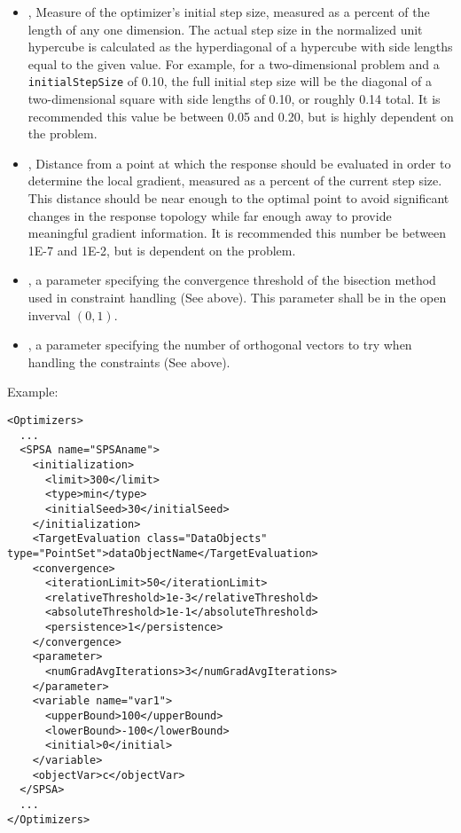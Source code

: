 \begin{itemize}
\begin{itemize}
  \item {},  Measure of the optimizer's initial step
    size, measured as a percent of the length of any one dimension. The actual step size in the normalized
    unit hypercube is calculated as the hyperdiagonal of a hypercube with side lengths equal to the given
    value. For example, for a two-dimensional problem and a \texttt{initialStepSize} of 0.10, the full initial
    step size will be the diagonal of a two-dimensional square with side lengths of 0.10, or roughly 0.14
    total. It is recommended this value be between 0.05 and 0.20, but is highly dependent on the problem.
  \item {},  Distance from a point at which the
    response should be evaluated in order to determine the local gradient, measured as a percent of the
    current step size. This distance should be near enough to the optimal point to avoid significant changes
    in the response topology while far enough away to provide meaningful gradient information. It is
    recommended this number be between 1E-7 and 1E-2, but is dependent on the problem.
  \item {},  a parameter specifying the convergence threshold of the
  bisection method used in constraint handling (See above). This parameter shall be in the open inverval $(0,1)$.
  \item {},  a parameter specifying the number of orthogonal vectors to try
  when handling the constraints (See above).
  \end{itemize}
\end{itemize}


Example:
\begin{lstlisting}[style=XML]
<Optimizers>
  ...
  <SPSA name="SPSAname">
    <initialization>
      <limit>300</limit>
      <type>min</type>
      <initialSeed>30</initialSeed>
    </initialization>
    <TargetEvaluation class="DataObjects" type="PointSet">dataObjectName</TargetEvaluation>
    <convergence>
      <iterationLimit>50</iterationLimit>
      <relativeThreshold>1e-3</relativeThreshold>
      <absoluteThreshold>1e-1</absoluteThreshold>
      <persistence>1</persistence>
    </convergence>
    <parameter>
      <numGradAvgIterations>3</numGradAvgIterations>
    </parameter>
    <variable name="var1">
      <upperBound>100</upperBound>
      <lowerBound>-100</lowerBound>
      <initial>0</initial>
    </variable>
    <objectVar>c</objectVar>
  </SPSA>
  ...
</Optimizers>
\end{lstlisting}


